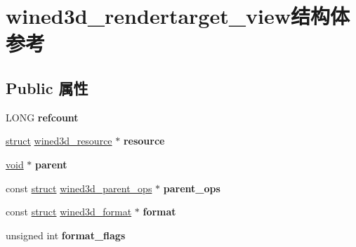 \hypertarget{structwined3d__rendertarget__view}{}\section{wined3d\+\_\+rendertarget\+\_\+view结构体 参考}
\label{structwined3d__rendertarget__view}
\subsection*{Public 属性}
\begin{DoxyCompactItemize}
\item 
\mbox{\label{structwined3d__rendertarget__view_a70b7535dc7d8de4e3cb671002333cd62}} 
L\+O\+NG {\bfseries refcount}
\item 
\mbox{\label{structwined3d__rendertarget__view_a614058ebca6e5619ec857fc1f4c4db37}} 
\hyperlink{interfacestruct}{struct} \hyperlink{structwined3d__resource}{wined3d\+\_\+resource} $\ast$ {\bfseries resource}
\item 
\mbox{\label{structwined3d__rendertarget__view_af4ccc6396d8bf8af19262e2202a73a02}} 
\hyperlink{interfacevoid}{void} $\ast$ {\bfseries parent}
\item 
\mbox{\label{structwined3d__rendertarget__view_aebefe008a17aa596a8adb70d4bef24af}} 
const \hyperlink{interfacestruct}{struct} \hyperlink{structwined3d__parent__ops}{wined3d\+\_\+parent\+\_\+ops} $\ast$ {\bfseries parent\+\_\+ops}
\item 
\mbox{\label{structwined3d__rendertarget__view_aecf2c5accf910ccac65389233553b3d8}} 
const \hyperlink{interfacestruct}{struct} \hyperlink{structwined3d__format}{wined3d\+\_\+format} $\ast$ {\bfseries format}
\item 
\mbox{\label{structwined3d__rendertarget__view_a077945d472fdadc662609f575ff62db4}} 
unsigned int {\bfseries format\+\_\+flags}
\item 
\mbox{\label{structwined3d__rendertarget__view_af2921e712ac795a7d54a5277b43fc97c}} 

\end{DoxyCompactItemize}

